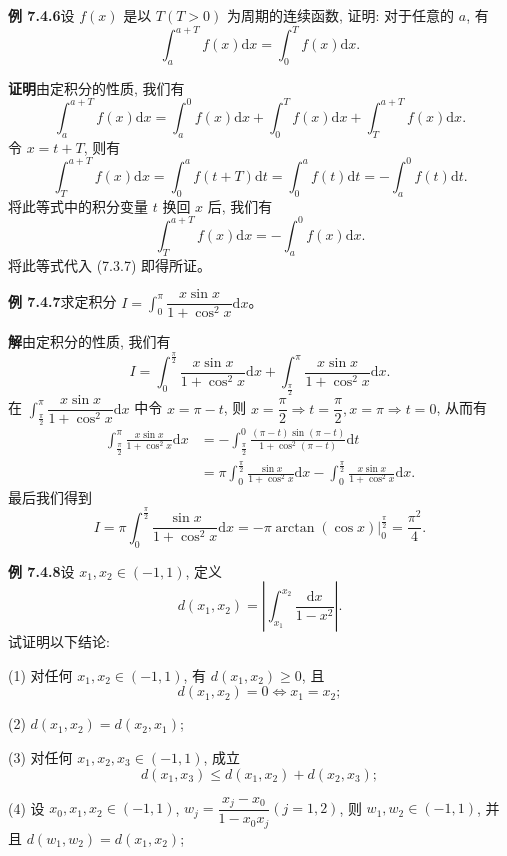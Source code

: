 \documentclass[UTF8,12pt,a4paper,fontset=fandol]{ctexart}
\begin{document}
\noindent\textbf{例 7.4.6}\quad 设 $f(x)$ 是以 $T(T>0)$ 为周期的连续函数, 证明: 对于任意的 $a$, 有
\[
  \int_a^{a+T} f(x)\mathrm dx=\int_0^T f(x)\mathrm dx.
\]

\noindent\textbf{证明}\quad 由定积分的性质, 我们有
\begin{equation}
  \int_a^{a+T} f(x)\mathrm dx
  =\int_a^0 f(x)\mathrm dx+\int_0^T f(x)\mathrm dx+\int_T^{a+T} f(x)\mathrm dx.
  \tag{7.3.7}
\end{equation}
令 $x=t+T$, 则有
\[
  \int_T^{a+T} f(x)\mathrm dx
  =\int_0^a f(t+T)\mathrm dt
  =\int_0^a f(t)\mathrm dt
  =-\int_a^0 f(t)\mathrm dt.
\]
将此等式中的积分变量 $t$ 换回 $x$ 后, 我们有
\[
  \int_T^{a+T} f(x)\mathrm dx=-\int_a^0 f(x)\mathrm dx.
\]
将此等式代入 (7.3.7) 即得所证。

\noindent\textbf{例 7.4.7}\quad 求定积分 $I=\int_0^\pi \dfrac{x\sin x}{1+\cos^2 x}\mathrm dx$。

\noindent\textbf{解}\quad 由定积分的性质, 我们有
\[
  I=\int_0^{\frac{\pi}{2}}\frac{x\sin x}{1+\cos^2 x}\mathrm dx
  +\int_{\frac{\pi}{2}}^\pi \frac{x\sin x}{1+\cos^2 x}\mathrm dx.
\]
在 $\int_{\frac{\pi}{2}}^\pi \dfrac{x\sin x}{1+\cos^2 x}\mathrm dx$ 中令 $x=\pi-t$, 则 $x=\dfrac{\pi}{2}\Rightarrow t=\dfrac{\pi}{2},x=\pi\Rightarrow t=0$, 从而有
\[
\begin{aligned}
  \int_{\frac{\pi}{2}}^\pi \frac{x\sin x}{1+\cos^2 x}\mathrm dx
  &=-\int_{\frac{\pi}{2}}^0
  \frac{(\pi-t)\sin(\pi-t)}{1+\cos^2(\pi-t)}\mathrm dt\\
  &=\pi\int_0^{\frac{\pi}{2}}\frac{\sin x}{1+\cos^2 x}\mathrm dx
  -\int_0^{\frac{\pi}{2}}\frac{x\sin x}{1+\cos^2 x}\mathrm dx.
\end{aligned}
\]
最后我们得到
\[
  I=\pi\int_0^{\frac{\pi}{2}}\frac{\sin x}{1+\cos^2 x}\mathrm dx
  =-\left.\pi\arctan(\cos x)\right|_0^{\frac{\pi}{2}}
  =\frac{\pi^2}{4}.
\]

\noindent\textbf{例 7.4.8}\quad 设 $x_1,x_2\in(-1,1)$, 定义
\[
  d(x_1,x_2)=\left|\int_{x_1}^{x_2}\frac{\mathrm dx}{1-x^2}\right|.
\]
试证明以下结论:

(1) 对任何 $x_1,x_2\in(-1,1)$, 有 $d(x_1,x_2)\geq0$, 且
\[
  d(x_1,x_2)=0\Longleftrightarrow x_1=x_2;
\]

(2) $d(x_1,x_2)=d(x_2,x_1)$;

(3) 对任何 $x_1,x_2,x_3\in(-1,1)$, 成立
\[
  d(x_1,x_3)\leq d(x_1,x_2)+d(x_2,x_3);
\]

(4) 设 $x_0,x_1,x_2\in(-1,1)$, $w_j=\dfrac{x_j-x_0}{1-x_0x_j}(j=1,2)$, 则 $w_1,w_2\in(-1,1)$, 并且 $d(w_1,w_2)=d(x_1,x_2)$;
\end{document}
